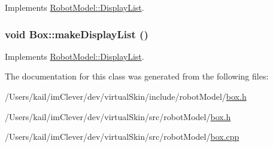 Implements \hyperlink{class_robot_model_1_1_display_list_a842de97924298c7363e50aebd69e5a50}{RobotModel::DisplayList}.\hypertarget{class_robot_model_1_1_box_a29420d81c8b3622c95a1976593e2cc4b}{
\subsubsection[{makeDisplayList}]{\setlength{\rightskip}{0pt plus 5cm}void Box::makeDisplayList ()}}
\label{class_robot_model_1_1_box_a29420d81c8b3622c95a1976593e2cc4b}


Implements \hyperlink{class_robot_model_1_1_display_list_a842de97924298c7363e50aebd69e5a50}{RobotModel::DisplayList}.

The documentation for this class was generated from the following files:\begin{DoxyCompactItemize}
\item 
/Users/kail/imClever/dev/virtualSkin/include/robotModel/\hyperlink{include_2robot_model_2box_8h}{box.h}\item 
/Users/kail/imClever/dev/virtualSkin/src/robotModel/\hyperlink{src_2robot_model_2box_8h}{box.h}\item 
/Users/kail/imClever/dev/virtualSkin/src/robotModel/\hyperlink{box_8cpp}{box.cpp}\end{DoxyCompactItemize}
